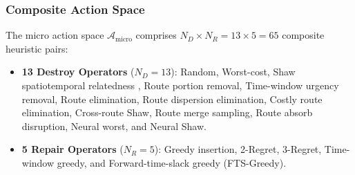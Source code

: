 \subsubsection{Composite Action Space}
The micro action space $\mathcal{A}_{\text{micro}}$ comprises $N_D \times N_R = 13 \times 5 = 65$ composite heuristic pairs:
\begin{itemize}
    \item \textbf{13 Destroy Operators} ($N_D=13$): Random, Worst-cost, Shaw spatiotemporal relatedness \cite{shaw1998using}, Route portion removal, Time-window urgency removal, Route elimination, Route dispersion elimination, Costly route elimination, Cross-route Shaw, Route merge sampling, Route absorb disruption, Neural worst, and Neural Shaw.
    \item \textbf{5 Repair Operators} ($N_R=5$): Greedy insertion, 2-Regret, 3-Regret, Time-window greedy, and Forward-time-slack greedy (FTS-Greedy).
\end{itemize}

